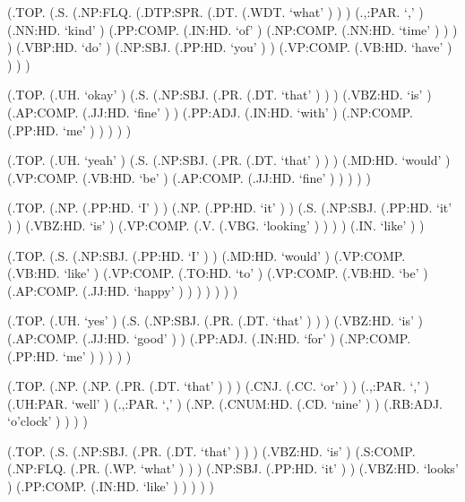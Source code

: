 \documentclass[10pt]{article}
\begin{document}
\begin{parsetree}  (.TOP. (.S. (.NP:FLQ. (.DTP:SPR. (.DT. (.WDT. `what' ) ) ) (.,:PAR. `,' ) (.NN:HD. `kind' ) (.PP:COMP. (.IN:HD. `of' ) (.NP:COMP. (.NN:HD. `time' ) ) ) ) (.VBP:HD. `do' ) (.NP:SBJ. (.PP:HD. `you' ) ) (.VP:COMP. (.VB:HD. `have' ) ) ) ) \end{parsetree}

\begin{parsetree}  (.TOP. (.UH. `okay' ) (.S. (.NP:SBJ. (.PR. (.DT. `that' ) ) ) (.VBZ:HD. `is' ) (.AP:COMP. (.JJ:HD. `fine' ) ) (.PP:ADJ. (.IN:HD. `with' ) (.NP:COMP. (.PP:HD. `me' ) ) ) ) ) \end{parsetree}

\begin{parsetree}  (.TOP. (.UH. `yeah' ) (.S. (.NP:SBJ. (.PR. (.DT. `that' ) ) ) (.MD:HD. `would' ) (.VP:COMP. (.VB:HD. `be' ) (.AP:COMP. (.JJ:HD. `fine' ) ) ) ) ) \end{parsetree}

\begin{parsetree}  (.TOP. (.NP. (.PP:HD. `I' ) ) (.NP. (.PP:HD. `it' ) ) (.S. (.NP:SBJ. (.PP:HD. `it' ) ) (.VBZ:HD. `is' ) (.VP:COMP. (.V. (.VBG. `looking' ) ) ) ) (.IN. `like' ) ) \end{parsetree}

\begin{parsetree}  (.TOP. (.S. (.NP:SBJ. (.PP:HD. `I' ) ) (.MD:HD. `would' ) (.VP:COMP. (.VB:HD. `like' ) (.VP:COMP. (.TO:HD. `to' ) (.VP:COMP. (.VB:HD. `be' ) (.AP:COMP. (.JJ:HD. `happy' ) ) ) ) ) ) ) \end{parsetree}

\begin{parsetree}  (.TOP. (.UH. `yes' ) (.S. (.NP:SBJ. (.PR. (.DT. `that' ) ) ) (.VBZ:HD. `is' ) (.AP:COMP. (.JJ:HD. `good' ) ) (.PP:ADJ. (.IN:HD. `for' ) (.NP:COMP. (.PP:HD. `me' ) ) ) ) ) \end{parsetree}

\begin{parsetree}  (.TOP. (.NP. (.NP. (.PR. (.DT. `that' ) ) ) (.CNJ. (.CC. `or' ) ) (.,:PAR. `,' ) (.UH:PAR. `well' ) (.,:PAR. `,' ) (.NP. (.CNUM:HD. (.CD. `nine' ) ) (.RB:ADJ. `o'clock' ) ) ) ) \end{parsetree}

\begin{parsetree}  (.TOP. (.S. (.NP:SBJ. (.PR. (.DT. `that' ) ) ) (.VBZ:HD. `is' ) (.S:COMP. (.NP:FLQ. (.PR. (.WP. `what' ) ) ) (.NP:SBJ. (.PP:HD. `it' ) ) (.VBZ:HD. `looks' ) (.PP:COMP. (.IN:HD. `like' ) ) ) ) ) \end{parsetree}
\end{document}
